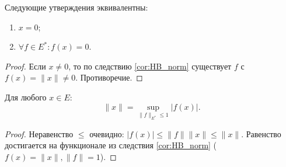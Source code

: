 \begin{corollary}\label{hbcorollary3}
	Следующие утверждения эквивалентны:
	\begin{enumerate}
		\item $x = 0$;
		\item $\forall f \in E^*: f(x) = 0$.
	\end{enumerate}
\end{corollary}
\begin{proof}
	Если $x \neq 0$, то по следствию \ref{cor:HB_norm} существует $f$ с $f(x) = \|x\| \neq 0$. Противоречие.
\end{proof}

\begin{corollary}\label{hbcorollary4}
	Для любого $x \in E$:
	\[ \|x\| = \sup_{\|f\|_{E^*} \leqslant 1} |f(x)|. \]
\end{corollary}
\begin{proof}
	Неравенство $\leqslant$ очевидно: $|f(x)| \leqslant \|f\|\|x\| \leqslant \|x\|$.
	Равенство достигается на функционале из следствия \ref{cor:HB_norm} ($f(x)=\|x\|, \|f\|=1$).
\end{proof}